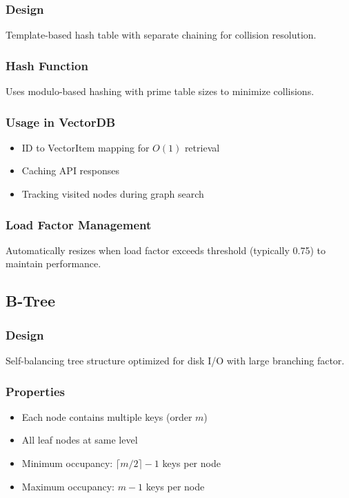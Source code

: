 \documentclass[12pt,a4paper]{article}
\begin{document}
\subsubsection{Design}
Template-based hash table with separate chaining for collision resolution.

\subsubsection{Hash Function}
Uses modulo-based hashing with prime table sizes to minimize collisions.

\subsubsection{Usage in VectorDB}
\begin{itemize}
    \item ID to VectorItem mapping for $O(1)$ retrieval
    \item Caching API responses
    \item Tracking visited nodes during graph search
\end{itemize}

\subsubsection{Load Factor Management}
Automatically resizes when load factor exceeds threshold (typically 0.75) to maintain performance.

\subsection{B-Tree}

\subsubsection{Design}
Self-balancing tree structure optimized for disk I/O with large branching factor.

\subsubsection{Properties}
\begin{itemize}
    \item Each node contains multiple keys (order $m$)
    \item All leaf nodes at same level
    \item Minimum occupancy: $\lceil m/2 \rceil - 1$ keys per node
    \item Maximum occupancy: $m - 1$ keys per node
\end{itemize}
\end{document}
